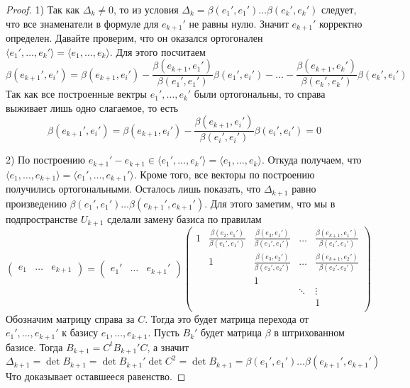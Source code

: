 \begin{proof}
1) Так как $\Delta_k\neq 0$, то из условия $\Delta_k = \beta(e_1',e_1') \ldots \beta(e_k',e_k')$ следует, что все знаменатели в формуле для $e_{k+1}'$ не равны нулю.
Значит $e_{k+1}'$ корректно определен.
Давайте проверим, что он оказался ортогонален $\langle e_1',\ldots,e_k'\rangle = \langle e_1,\ldots,e_k\rangle$.
Для этого посчитаем 
\[
\beta(e_{k+1}', e_i') = \beta(e_{k+1}, e_i') - \frac{\beta(e_{k+1}, e_1')}{\beta(e_1',e_1')}\beta(e_1', e_i') - \ldots - \frac{\beta(e_{k+1}, e_{k}')}{\beta(e_{k}',e_{k}')}\beta(e_{k}', e_i')
\]
Так как все построенные вектры $e_1',\ldots,e_k'$ были ортогональны, то справа выживает лишь одно слагаемое, то есть
\[
\beta(e_{k+1}', e_i') = \beta(e_{k+1}, e_i') - \frac{\beta(e_{k+1}, e_i')}{\beta(e_i',e_i')}\beta(e_i', e_i') = 0
\]

2) По построению $e_{k+1}'-e_{k+1} \in \langle e_1',\ldots,e_k'\rangle = \langle e_1,\ldots,e_k\rangle$.
Откуда получаем, что $\langle e_1,\ldots,e_{k+1}\rangle = \langle e_1',\ldots,e_{k+1}'\rangle$.
Кроме того, все векторы по построению получились ортогональными.
Осталось лишь показать, что $\Delta_{k+1}$ равно произведению $\beta(e_1',e_1')\ldots \beta(e_{k+1}',e_{k+1}')$.
Для этого заметим, что мы в подпространстве $U_{k+1}$ сделали замену базиса по правилам
\[
\begin{pmatrix}
{e_1}&{\ldots}&{e_{k+1}}
\end{pmatrix}
=
\begin{pmatrix}
{e_1'}&{\ldots}&{e_{k+1}'}
\end{pmatrix}
\begin{pmatrix}
{1}&{\frac{\beta(e_2,e_1')}{\beta(e_1',e_1')}}&{\frac{\beta(e_3,e_1')}{\beta(e_1',e_1')}}&{\ldots}&{\frac{\beta(e_{k+1},e_1')}{\beta(e_1',e_1')}}\\
{}&{1}&{\frac{\beta(e_3,e_2')}{\beta(e_2',e_2')}}&{\ldots}&{\frac{\beta(e_{k+1},e_2')}{\beta(e_2',e_2')}}\\
{}&{}&{1}&{}&{}\\
{}&{}&{}&{\ddots}&{\vdots}\\
{}&{}&{}&{}&{1}\\
\end{pmatrix}
\]
Обозначим матрицу справа за $C$.
Тогда это будет матрица перехода от $e_1',\ldots,e_{k+1}'$ к базису $e_1,\ldots,e_{k+1}$.
Пусть $B_k'$ будет матрица $\beta$ в штрихованном базисе.
Тогда $B_{k+1} = C^t B_{k+1}' C$, а значит 
\[
\Delta_{k+1} = \det B_{k+1}  = \det B_{k+1}' \det C^2 = \det B_{k+1} = \beta(e_1',e_1')\ldots \beta(e_{k+1}',e_{k+1}')
\]
Что доказывает оставшееся равенство.
\end{proof}

